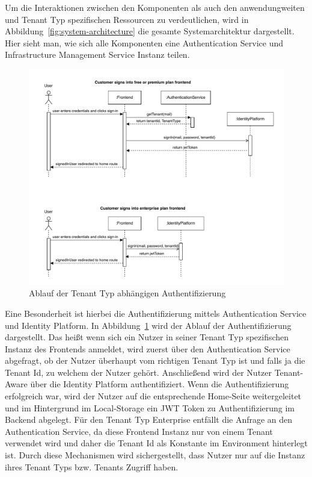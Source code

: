 Um die Interaktionen zwischen den Komponenten als auch den anwendungweiten und Tenant Typ spezifischen Ressourcen zu verdeutlichen, wird in Abbildung~\ref{fig:system-architecture} die gesamte Systemarchitektur dargestellt. Hier sieht man, wie sich alle Komponenten eine Authentication Service und Infrastructure Management Service Instanz teilen.

\begin{figure}[ht]
	\centering
	\includegraphics[width=\textwidth]{resources/03-runtime-view/pdf/authentication-sequence.pdf}
	\caption{Ablauf der Tenant Typ abhängigen Authentifizierung}
	\label{fig:authentication-sequence}
\end{figure}

Eine Besonderheit ist hierbei die Authentifizierung mittels Authentication Service und Identity Platform. In Abbildung~\ref{fig:authentication-sequence} wird der Ablauf der Authentifizierung dargestellt. Das heißt wenn sich ein Nutzer in seiner Tenant Typ spezifischen Instanz des Frontends anmeldet, wird zuerst über den Authentication Service abgefragt, ob der Nutzer überhaupt vom richtigen Tenant Typ ist und falls ja die Tenant Id, zu welchem der Nutzer gehört. Anschließend wird der Nutzer Tenant-Aware über die Identity Platform authentifiziert. Wenn die Authentifizierung erfolgreich war, wird der Nutzer auf die entsprechende Home-Seite weitergeleitet und im Hintergrund im Local-Storage ein JWT Token zu Authentifizierung im Backend abgelegt.
Für den Tenant Typ Enterprise entfällt die Anfrage an den Authentication Service, da diese Frontend Instanz nur von einem Tenant verwendet wird und daher die Tenant Id als Konstante im Environment hinterlegt ist. Durch diese Mechanismen wird sichergestellt, dass Nutzer nur auf die Instanz ihres Tenant Typs bzw. Tenants Zugriff haben.

